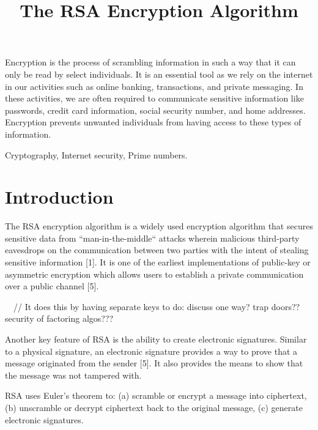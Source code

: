 \documentclass[10pt]{article}
\begin{document}
\noindent



\title{The RSA Encryption Algorithm}


\maketitle

\abstract
Encryption is the process of scrambling information in such a way that it can only be read by select individuals. It is an essential tool as we rely on the internet in our 
 activities such as online banking, transactions, and private messaging. In these activities, we are often required to communicate sensitive information like passwords, credit card information, social security number, and home addresses. Encryption prevents unwanted individuals from having access to these types of information.

\keywords
Cryptography, Internet security, Prime numbers.

\section{Introduction}
The RSA encryption algorithm is a widely used encryption algorithm that secures sensitive data from “man-in-the-middle“ attacks wherein malicious third-party eavesdrops on the communication between two parties with the intent of stealing sensitive information [1]. It is one of the earliest implementations of public-key or asymmetric encryption which allows users to establish a private communication over a public channel [5].

  \ \ // It does this by having separate keys to do: discuss one way? trap doors?? security of factoring algos???

Another key feature of RSA is the ability to create electronic signatures. Similar to a physical signature, an electronic signature provides a way to prove that a message originated from the sender [5]. It also provides the means to show that the message was not tampered with.

RSA uses Euler’s theorem to: (a) scramble or encrypt a message into ciphertext, (b) unscramble or decrypt ciphertext back to the original message, (c) generate electronic signatures.
\end{document}
